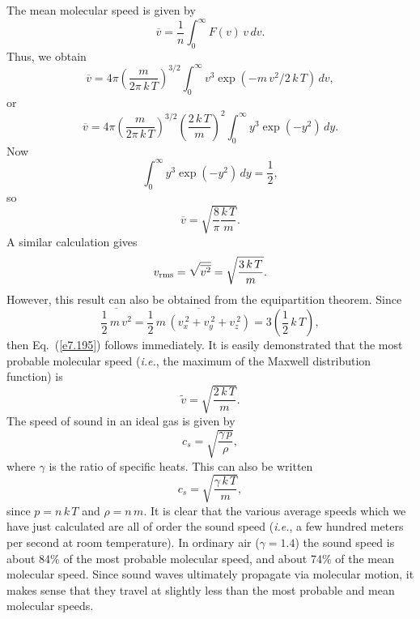 The mean molecular speed is given by
\begin{equation}
\overline{v} = \frac{1}{n} \int_0^\infty F(v)\,v\,dv.
\end{equation}
Thus, we obtain
\begin{equation}
\overline{v} = 4\pi \left(\frac{m}{2\pi \,k\,T}\right)^{3/2} 
\int_0^\infty v^3 \exp
(-m\,v^2/2\,k\,T)\,dv,
\end{equation}
or
\begin{equation}
\overline{v} =  4\pi \left(\frac{m}{2\pi \,k\,T}\right)^{3/2} 
\left(\frac{2\,k\,T}{m}\right)^2 \int_0^\infty y^3 \exp(-y^2)\,dy.
\end{equation}
Now
\begin{equation}
\int_0^\infty y^3 \exp(-y^2)\,dy = \frac{1}{2},
\end{equation}
so
\begin{equation}
\overline{v} = \sqrt{\frac{8}{\pi} \frac{k\,T}{m}}.
\end{equation}
A similar calculation gives
\begin{equation}
v_{\rm rms} = \sqrt{\overline{v^2}} = \sqrt{\frac{3\, k\,T}{m}}.\label{e7.195}
\end{equation}
However, this result can also be obtained from the equipartition theorem.
Since
\begin{equation}
\overline{\frac{1}{2}\,m\,v^2} = \overline{\frac{1}{2}\,m\,(v_x^{~2}+v_y^{~2}+v_z^{~2})}
= 3 \left(\frac{1}{2}\, k\,T\right),
\end{equation}
then Eq.~(\ref{e7.195}) follows immediately. It is easily demonstrated that the most probable
molecular speed ({\em i.e.}, the maximum of the Maxwell distribution function) is
\begin{equation}
\tilde{v} = \sqrt{\frac{2\, k\,T}{m}}.
\end{equation}
The speed of sound in an ideal gas is given by
\begin{equation}
c_s = \sqrt{\frac{\gamma \,p}{\rho}},
\end{equation}
where $\gamma$ is the ratio of specific heats. This can also be written
\begin{equation}
c_s=\sqrt{\frac{\gamma\, k\,T}{m}},
\end{equation}
since $p = n\,k\,T$ and $\rho = n\, m$. It is clear that the various average speeds which
we have just calculated are all of order the sound speed ({\em i.e.}, a few hundred
meters per second at room temperature). In ordinary air ($\gamma= 1.4$) the
sound speed is about 84\% of the most probable molecular speed, and about
74\% of the mean molecular speed. Since sound waves 
ultimately propagate via molecular
motion, it makes sense that they travel at slightly less than the most probable
and mean
molecular speeds.

